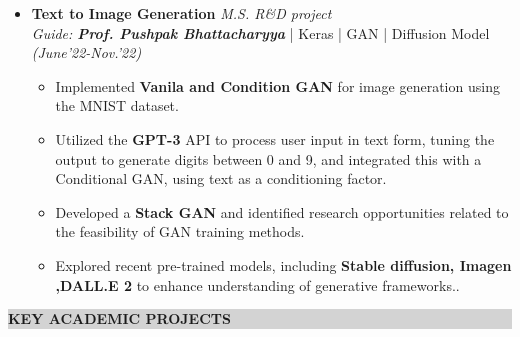 \documentclass[a4paper,10.5pt]{article}
\newcommand{\lsep}{-0.5cm}
\newcommand{\resheading}[1]{{\small \colorbox{lightgray}{\begin{minipage}{0.975\textwidth}{\textbf{#1 \vphantom{p\^{E}}}}\end{minipage}}}}
\begin{document}
\begin{itemize}
\textbf{Future work:}\\[-0.5cm]
    \begin{itemize}[noitemsep,nolistsep]
        \item Investigating approaches to generalize \textbf{human-crafted} labeling functions for Named Entity Recognition (NER).
        \vspace{0.07cm}
        \item Automating the creation of \textbf{labeling functions} and transforming the model into a user-friendly product.
    \end{itemize}
\vspace{-0.1cm}

\item \textbf{Text to Image Generation} \hfill \emph{M.S. R\&D project}\\
\emph{Guide: \textbf{Prof. Pushpak Bhattacharyya}} | {Keras | GAN | Diffusion Model } \hfill \emph{(June'22-Nov.'22)}\\[-0.5cm]

    \begin{itemize}[noitemsep,nolistsep]
        \item Implemented \textbf{Vanila and Condition GAN} for image generation using the MNIST dataset.
        \vspace{0.07cm}
        \item Utilized the \textbf{GPT-3} API to process user input in text form, tuning the output to generate digits between 0 and 9, and integrated this with a Conditional GAN, using text as a conditioning factor.
        \vspace{0.07cm}

        \item Developed a \textbf{Stack GAN} and identified research opportunities related to the feasibility of GAN training methods.

        \item Explored recent pre-trained models, including \textbf{Stable diffusion, Imagen ,DALL.E 2} to enhance understanding of generative frameworks..

    \end{itemize}
\vspace{-0.1cm}
\end{itemize}

\resheading{\textbf{KEY ACADEMIC PROJECTS}}\\[\lsep] \\[-0.4cm]
\vspace{0.3cm}
\end{document}
